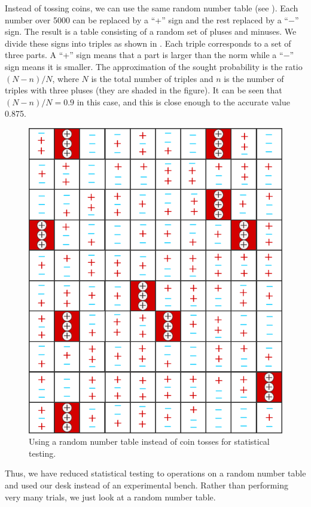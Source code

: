  Instead of tossing coins, we can use the same random
number table (see ). Each number over \num{5000} can be replaced by a ``+'' sign and the rest replaced by a ``$-$'' sign. The result is a table
consisting of a random set of pluses and minuses. We divide these signs
into triples as shown in . Each triple corresponds to a set of three parts. A ``+'' sign means that a part is larger than the norm while
a ``$-$'' sign means it is smaller. The approximation of the sought
probability is the ratio $(N - n)/N$, where $N$ is the total number of triples
and $n$ is the number of triples with three pluses (they are shaded in the
figure). It can be seen that $(N - n)/N = 0.9$ in this case, and this is close
enough to the accurate value 0.875.
 \begin{figure}[!h]
 \centering
 \includegraphics[width=0.75\tfwidth]{figures/monte-carlo3.pdf}
\caption{Using a random number table instead of coin tosses for statistical testing.\label{monte-carlo3}}
 \end{figure}

Thus, we have reduced statistical testing to operations on a random
number table and used our desk instead of an experimental bench.
Rather than performing very many trials, we just look at a random
number table.


